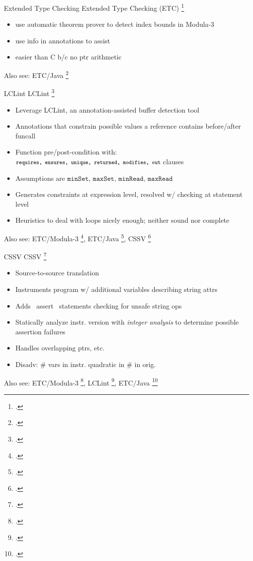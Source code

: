\documentclass[aspectratio=169]{beamer}
\begin{document}
\begin{frame}[fragile]{Extended Type Checking}
Extended Type Checking (ETC) \footcite{detlefs_overview_1995}
    \begin{itemize}
      \item use automatic theorem prover to detect index bounds in Modula-3
      \item use info in annotations to assist
      \item easier than C b/c no ptr arithmetic
    \end{itemize}
Also see: ETC/Java \footcite{flanagan_extended_2002}
\end{frame}

\begin{frame}[fragile]{LCLint}
LCLint \footcite{larochelle_statically_2001}
\begin{itemize}
    \item Leverage LCLint, an annotation-assisted buffer detection tool
    \item Annotations that constrain possible values a reference contains before/after funcall
    \item Function pre/post-condition with: $\footnotesize{\texttt{requires, ensures, unique, returned, modifies, out}}$ clauses
    \item Assumptions are $\texttt{minSet, maxSet, minRead, maxRead}$ %
    \item Generates constraints at expression level, resolved w/ checking at statement level
    \item Heuristics to deal with loops nicely enough; neither sound nor complete
\end{itemize}
    Also see: ETC/Modula-3 \footcite{detlefs_overview_1995}, ETC/Java \footcite{flanagan_extended_2002}, CSSV \footcite{dor_cssv:_2003}
    \vspace{0.2in}
\end{frame}

\begin{frame}[fragile]{CSSV}
CSSV \footcite{dor_cssv:_2003}
\begin{itemize}
    \item Source-to-source translation
    \item Instruments program w/ additional variables describing string attrs
    \item Adds ~assert~ statements checking for unsafe string ops
    \item Statically analyze instr. version with \emph{integer analysis} to determine possible assertion failures
    \item Handles overlapping ptrs, etc.
    \item Disadv: \# vars in instr. quadratic in \# in orig.
\end{itemize}
    Also see: ETC/Modula-3 \footcite{detlefs_overview_1995}, LCLint \footcite{larochelle_statically_2001}, ETC/Java \footcite{flanagan_extended_2002}
    \vspace{0.2in}
\end{frame}
\end{document}
